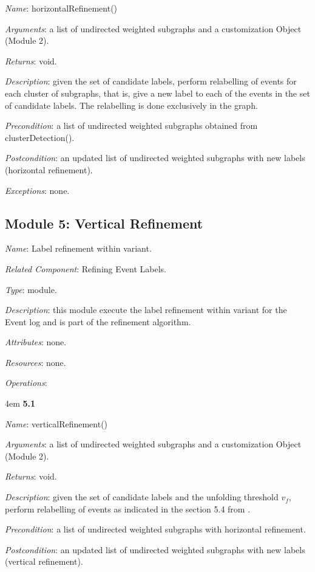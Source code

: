 \documentclass[notitlepage]{article}
\begin{document}
\begin{flushleft}
\textit{Name}: horizontalRefinement()

\textit{Arguments}: a list of undirected weighted subgraphs and a customization Object (Module 2).

\textit{Returns}: void.

\textit{Description}: given the set of candidate labels, perform relabelling of events for each cluster of subgraphs, that is, give a new label to each of the events in the set of candidate labels. The relabelling is done exclusively in the graph.

\textit{Precondition}: a list of undirected weighted subgraphs obtained from clusterDetection().

\textit{Postcondition}: an updated list of undirected weighted subgraphs with new labels (horizontal refinement).

\textit{Exceptions}: none.
\par
\endgroup

\subsection{Module 5: Vertical Refinement}
\textit{Name}: Label refinement within variant.

\textit{Related Component}: Refining Event Labels.

\textit{Type}: module.

\textit{Description}: this module execute the label refinement within variant for the Event log and is part of the refinement algorithm.

\textit{Attributes}: none.

\textit{Resources}: none.

\textit{Operations}: 
\medskip

\par
\begingroup
\leftskip4em
\textbf{5.1} 

\textit{Name}: verticalRefinement()

\textit{Arguments}: a list of undirected weighted subgraphs and a customization Object (Module 2).

\textit{Returns}: void.

\textit{Description}: given the set of candidate labels and the unfolding threshold $v_f$, perform relabelling of events as indicated in the section 5.4 from \cite{paper}.

\textit{Precondition}: a list of undirected weighted subgraphs with horizontal refinement.

\textit{Postcondition}: an updated list of undirected weighted subgraphs with new labels (vertical refinement).


\end{flushleft}
\end{document}
